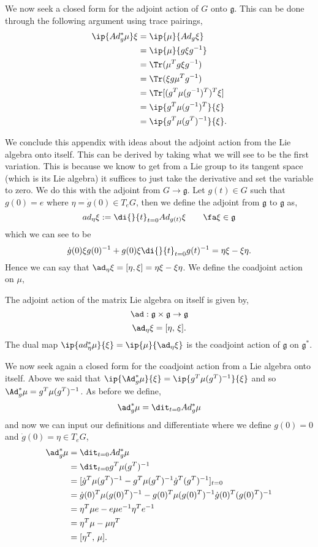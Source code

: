 \noindent
We now seek a closed form for the adjoint action of $G$ onto $\mathfrak{g}$. This can be done through the following argument using trace pairings,
\begin{align*}
  \ip {Ad^*_g \mu} \xi &= \ip {\mu} {Ad_g\xi}\\
  &= \ip {\mu} {g\xi g^{-1}}\\
  &= \Tr(\mu^Tg\xi g^{-1})\\
  &= \Tr(\xi g\mu^Tg^{-1})\\
  &= \Tr [(g^T\mu(g^{-1})^T)^T\xi]\\
  &= \ip{g^T\mu (g^{-1})^T} {\xi}\\
  &= \ip{g^T\mu (g^T)^{-1}} {\xi}.
\end{align*}

\noindent
We conclude this appendix with ideas about the adjoint action from the Lie algebra onto itself. This can be derived by taking what we will see to be the first variation. This is because we know to get from a Lie group to its tangent space (which is its Lie algebra) it suffices to just take the derivative and set the variable to zero. We do this with the adjoint from $G \to \mathfrak{g}$. Let $g(t) \in G$ such that $g(0) = e$ where $\eta = \dot g (0) \in T_eG$, then we define the adjoint from $\mathfrak{g}$ to $\mathfrak{g}$ as,
$$ ad_\eta \xi := \di {}{t} _{t = 0} Ad_{g(t)}\xi \qquad \fa \xi \in \mathfrak{g} $$
which we can see to be
$$ \dot g(0)\xi g(0)^{-1} + g(0)\xi \di {}{t}_{t=0} g(t)^{-1}= \eta\xi - \xi\eta. $$
Hence we can say that $\ad_{\eta}\xi = [\eta, \xi] = \eta\xi - \xi\eta$. We define the coadjoint action on $\mu$,
\begin{ndefi}
  The adjoint action of the matrix Lie algebra on itself is given by,
  $$ \ad : \mathfrak{g}\times \mathfrak{g} \to \mathfrak{g} $$
  $$ \ad_\eta \xi = [\eta,\, \xi]. $$
  The dual map $\ip{ad^*_\eta \mu}{\xi} = \ip{\mu}{\ad_\eta \xi}$ is the coadjoint action of $\mathfrak{g}$ on $\mathfrak{g}^*$.
\end{ndefi}
\noindent
We now seek again a closed form for the coadjoint action from a Lie algebra onto itself. Above we said that $\ip{\Ad^*_g\mu}{\xi} = \ip{g^T \mu (g^T)^{-1}}{\xi}$ and so $\Ad^*_g \mu = g^T \mu (g^T)^{-1}$. As before we define,
$$ \ad^*_g \mu = \dit_{t=0} Ad_g^* \mu $$
and now we can input our definitions and differentiate where we define $g(0) = 0$ and $\dot g (0) = \eta \in T_eG$,
\begin{align*}
  \ad^*_g \mu &= \dit_{t=0} Ad_g^* \mu \\
  &= \dit_{t=0} g^T \mu (g^T)^{-1} \\
  &= [\dot g^T \mu (g^T)^{-1} - g^T \mu (g^T)^{-1}\dot g^T (g^T)^{-1}]_{t=0} \\
  &= \dot g(0)^T \mu (g(0)^T)^{-1} - g(0)^T \mu (g(0)^T)^{-1}\dot g(0)^T (g(0)^T)^{-1} \\
  &= \eta^T \mu e - e \mu e^{-1} \eta^T e^{-1} \\
  &= \eta^T \mu - \mu \eta^T \\
  &= [\eta^T,\,\mu].
\end{align*}
